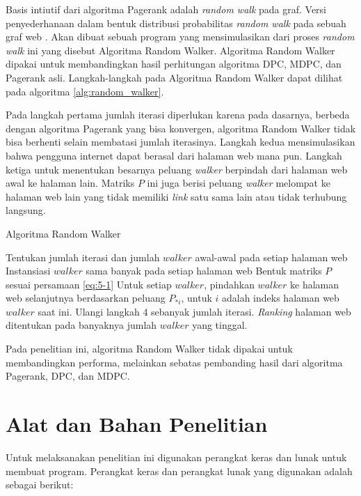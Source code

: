 Basis intiutif dari algoritma Pagerank adalah \textit{random walk} pada graf. Versi penyederhanaan dalam bentuk distribusi probabilitas \textit{random walk} pada sebuah graf web \citep{ilprints422}. Akan dibuat sebuah program yang mensimulasikan dari proses \textit{random walk} ini yang disebut Algoritma Random Walker. Algoritma Random Walker dipakai untuk membandingkan hasil perhitungan algoritma DPC, MDPC, dan Pagerank asli. Langkah-langkah pada Algoritma Random Walker dapat dilihat pada algoritma \ref{alg:random_walker}.

Pada langkah pertama jumlah iterasi diperlukan karena pada dasarnya, berbeda dengan algoritma Pagerank yang bisa konvergen, algoritma Random Walker tidak bisa berhenti selain membatasi jumlah iterasinya. Langkah kedua mensimulasikan bahwa pengguna internet dapat berasal dari halaman web mana pun. Langkah ketiga untuk menentukan besarnya peluang \textit{walker} berpindah dari halaman web awal ke halaman lain. Matriks $P$ ini juga berisi peluang \textit{walker} melompat ke halaman web lain yang tidak memiliki \textit{link} satu sama lain atau tidak terhubung langsung.

\begin{breakablealgorithm}
	\label{alg:random_walker}
	\caption{Algoritma Random Walker}
	\begin{algorithmic}[1]
		\State Tentukan jumlah iterasi dan jumlah $walker$ awal-awal pada setiap halaman web
		\State Instansiasi $walker$ sama banyak pada setiap halaman web
		\State Bentuk matriks $P$ sesuai persamaan \ref{eq:5-1}
		\State Untuk setiap $walker$, pindahkan $walker$ ke halaman web selanjutnya berdasarkan peluang $P_{*i}$, untuk $i$ adalah indeks halaman web $walker$ saat ini.
		\State Ulangi langkah 4 sebanyak jumlah iterasi. \textit{Ranking} halaman web ditentukan pada banyaknya jumlah $walker$ yang tinggal.
	\end{algorithmic}
\end{breakablealgorithm}

Pada penelitian ini, algoritma Random Walker tidak dipakai untuk membandingkan performa, melainkan sebatas pembanding hasil dari algoritma Pagerank, DPC, dan MDPC.

\section{Alat dan Bahan Penelitian}

Untuk melaksanakan penelitian ini digunakan perangkat keras dan lunak untuk membuat program. Perangkat keras dan perangkat lunak yang digunakan adalah sebagai berikut:

